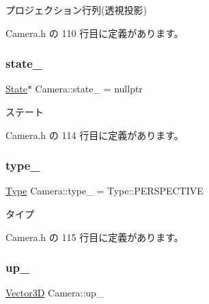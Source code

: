 プロジェクション行列(透視投影) 



 Camera.\+h の 110 行目に定義があります。

\mbox{\label{class_camera_ab2f0ce08b9fee8a4481b323f2856b245}} 
\subsubsection{\texorpdfstring{state\+\_\+}{state\_}}
{\footnotesize\ttfamily \mbox{\hyperlink{class_camera_1_1_state}{State}}$\ast$ Camera\+::state\+\_\+ = nullptr\hspace{0.3cm}{\ttfamily [private]}}



ステート 



 Camera.\+h の 114 行目に定義があります。

\mbox{\label{class_camera_a18f6d287c98a979a2ca1579eb928d9aa}} 
\subsubsection{\texorpdfstring{type\+\_\+}{type\_}}
{\footnotesize\ttfamily \mbox{\hyperlink{class_camera_a3b0a1f58deca679ac665f61c480d1dcb}{Type}} Camera\+::type\+\_\+ = Type\+::\+P\+E\+R\+S\+P\+E\+C\+T\+I\+VE\hspace{0.3cm}{\ttfamily [private]}}



タイプ 



 Camera.\+h の 115 行目に定義があります。

\mbox{\label{class_camera_a8df7d311c10a0c640ac480cb5cbada83}} 
\subsubsection{\texorpdfstring{up\+\_\+}{up\_}}
{\footnotesize\ttfamily \mbox{\hyperlink{class_vector3_d}{Vector3D}} Camera\+::up\+\_\+\hspace{0.3cm}{\ttfamily [private]}}



